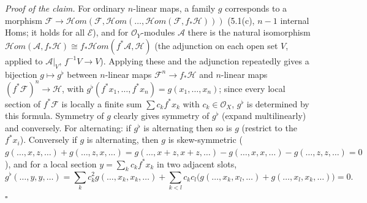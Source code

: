 \documentclass[11pt]{article}
\begin{document}
\emph{Proof of the claim.} For ordinary $n$-linear maps, a family $g$ corresponds to a morphism $\mathcal F\to\mathcal{H}om(\mathcal F,\mathcal{H}om(\dots,\mathcal{H}om(\mathcal F,f_*\mathcal H)))$ (5.1(c), $n-1$ internal Homs; it holds for all $\mathcal E$), and for $\mathcal O_Y$-modules $\mathcal A$ there is the natural isomorphism $\mathcal{H}om(\mathcal A,f_*\mathcal H)\cong f_*\mathcal{H}om(f^*\mathcal A,\mathcal H)$ (the adjunction on each open set $V$, applied to $\mathcal A|_V$, $f^{-1}V\to V$). Applying these and the adjunction repeatedly gives a bijection $g\mapsto g^\flat$ between $n$-linear maps $\mathcal F^n\to f_*\mathcal H$ and $n$-linear maps $(f^*\mathcal F)^n\to\mathcal H$, with $g^\flat(f^*x_1,\dots,f^*x_n)=g(x_1,\dots,x_n)$; since every local section of $f^*\mathcal F$ is locally a finite sum $\sum c_kf^*x_k$ with $c_k\in\mathcal O_X$, $g^\flat$ is determined by this formula. Symmetry of $g$ clearly gives symmetry of $g^\flat$ (expand multilinearly) and conversely. For alternating: if $g^\flat$ is alternating then so is $g$ (restrict to the $f^*x_i$). Conversely if $g$ is alternating, then $g$ is skew-symmetric ($g(\dots,x,z,\dots)+g(\dots,z,x,\dots)=g(\dots,x+z,x+z,\dots)-g(\dots,x,x,\dots)-g(\dots,z,z,\dots)=0$), and for a local section $y=\sum_kc_kf^*x_k$ in two adjacent slots,
\[
g^\flat(\dots,y,y,\dots)=\sum_kc_k^2g(\dots,x_k,x_k,\dots)+\sum_{k<l}c_kc_l\big(g(\dots,x_k,x_l,\dots)+g(\dots,x_l,x_k,\dots)\big)=0.
\]
\hfill$\square$
\end{document}
